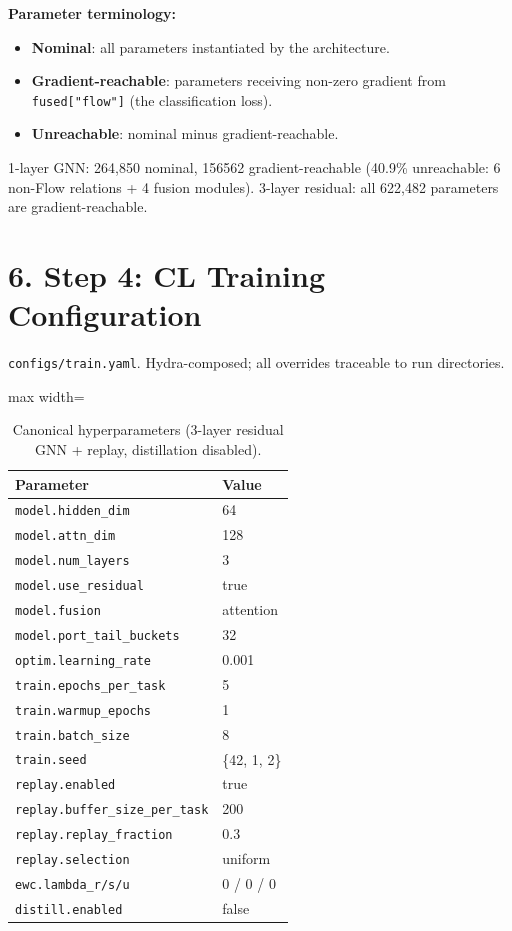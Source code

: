 \documentclass[11pt,a4paper]{article}
\begin{document}
\textbf{Parameter terminology:}
\begin{itemize}[leftmargin=*]
\item \textbf{Nominal}: all parameters instantiated by the architecture.
\item \textbf{Gradient-reachable}: parameters receiving non-zero gradient from \texttt{fused["flow"]} (the classification loss).
\item \textbf{Unreachable}: nominal minus gradient-reachable.
\end{itemize}
1-layer GNN: 264,850 nominal, \num{156562} gradient-reachable (\num{40.9}\% unreachable: 6 non-Flow relations + 4 fusion modules). 3-layer residual: all 622,482 parameters are gradient-reachable.

\section*{6. Step 4: CL Training Configuration}
\texttt{configs/train.yaml}. Hydra-composed; all overrides traceable to run directories.

\begin{table}[H]
\centering
\caption{Canonical hyperparameters (3-layer residual GNN + replay, distillation disabled).}
\label{tab:train-config}
\begin{adjustbox}{max width=\textwidth}
\begin{tabular}{ll}
\toprule
Parameter & Value \\
\midrule
\texttt{model.hidden\_dim} & 64 \\
\texttt{model.attn\_dim} & 128 \\
\texttt{model.num\_layers} & 3 \\
\texttt{model.use\_residual} & true \\
\texttt{model.fusion} & attention \\
\texttt{model.port\_tail\_buckets} & 32 \\
\texttt{optim.learning\_rate} & 0.001 \\
\texttt{train.epochs\_per\_task} & 5 \\
\texttt{train.warmup\_epochs} & 1 \\
\texttt{train.batch\_size} & 8 \\
\texttt{train.seed} & \{42, 1, 2\} \\
\texttt{replay.enabled} & true \\
\texttt{replay.buffer\_size\_per\_task} & 200 \\
\texttt{replay.replay\_fraction} & 0.3 \\
\texttt{replay.selection} & uniform \\
\texttt{ewc.lambda\_r/s/u} & 0 / 0 / 0 \\
\texttt{distill.enabled} & false \\
\bottomrule
\end{tabular}
\end{adjustbox}
\end{table}
\end{document}
